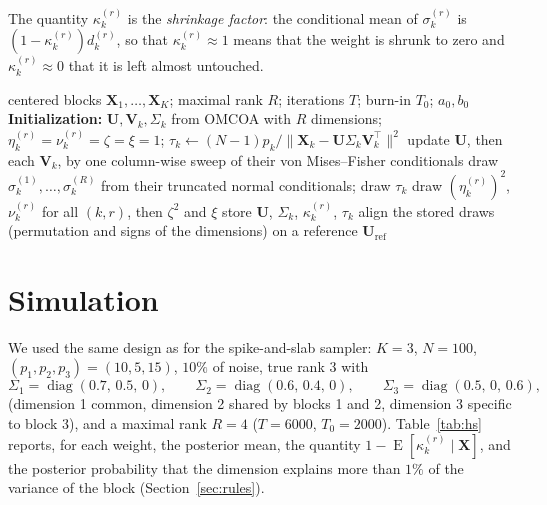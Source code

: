 \documentclass[11pt]{article}
\DeclareMathOperator{\diag}{diag}
\DeclareMathOperator{\E}{E}
\newcommand{\X}{\mathbf{X}}
\newcommand{\U}{\mathbf{U}}
\newcommand{\V}{\mathbf{V}}
\begin{document}
The quantity $\kappa_k^{(r)}$ is the \emph{shrinkage factor}: the conditional mean of $\sigma_k^{(r)}$ is
$(1-\kappa_k^{(r)})d_k^{(r)}$, so that $\kappa_k^{(r)}\approx1$ means that the weight is shrunk to zero and
$\kappa_k^{(r)}\approx0$ that it is left almost untouched.

\begin{algorithm}[ht]
\caption{Horseshoe Gibbs sampler for sparse OMCOA}\label{alg:hs}
\begin{algorithmic}[1]
  \Require centered blocks $\X_1,\ldots,\X_K$; maximal rank $R$; iterations $T$; burn-in $T_0$; $a_0,b_0$
  \State \textbf{Initialization:} $\U,\V_k,\Sigma_k$ from OMCOA with $R$ dimensions; $\eta_k^{(r)}=\nu_k^{(r)}=\zeta=\xi=1$;
         $\tau_k\gets(N-1)p_k/\|\X_k-\U\Sigma_k\V_k^\intercal\|^2$
    \State update $\U$, then each $\V_k$, by one column-wise sweep of their von Mises--Fisher conditionals
      \State draw $\sigma_k^{(1)},\ldots,\sigma_k^{(R)}$ from their truncated normal conditionals; draw $\tau_k$
    \EndFor
    \State draw $(\eta_k^{(r)})^2$, $\nu_k^{(r)}$ for all $(k,r)$, then $\zeta^2$ and $\xi$
     store $\U$, $\Sigma_k$, $\kappa_k^{(r)}$, $\tau_k$ \EndIf
  \EndFor
  \State align the stored draws (permutation and signs of the dimensions) on a reference $\U_{\mathrm{ref}}$
\end{algorithmic}
\end{algorithm}

\section{Simulation}

We used the same design as for the spike-and-slab sampler: $K=3$, $N=100$, $(p_1,p_2,p_3)=(10,5,15)$, $10\%$ of noise,
true rank $3$ with
\[
  \Sigma_1=\diag(0.7,\,0.5,\,0),\qquad\Sigma_2=\diag(0.6,\,0.4,\,0),\qquad\Sigma_3=\diag(0.5,\,0,\,0.6),
\]
(dimension 1 common, dimension 2 shared by blocks 1 and 2, dimension 3 specific to block 3), and a maximal rank $R=4$
($T=6000$, $T_0=2000$). Table~\ref{tab:hs} reports, for each weight, the posterior mean, the quantity
$1-\E[\kappa_k^{(r)}\mid\X]$, and the posterior probability that the dimension explains more than $1\%$ of the
variance of the block (Section~\ref{sec:rules}).
\end{document}
